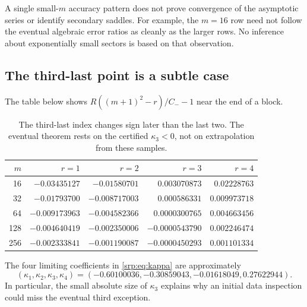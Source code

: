 \documentclass[11pt,a4paper]{article}
\numberwithin{equation}{section}
\theoremstyle{definition}
\theoremstyle{remark}
\begin{document}
A single small-$m$ accuracy pattern does not prove convergence of the
asymptotic series or identify secondary saddles. For example, the
$m=16$ row need not follow the eventual algebraic error ratios as cleanly
as the larger rows. No inference about exponentially small sectors is
based on that observation.

\subsection{The third-last point is a subtle case}
The table below shows
$R((m+1)^2-r)/C_- -1$ near the end of a block.
\begin{table}[htbp]
\centering\small
\begin{tabular}{r r r r r}
\toprule
$m$ & $r=1$ & $r=2$ & $r=3$ & $r=4$\\
\midrule
16 & $-0.03435127$ & $-0.01580701$ & $0.003070873$ & $0.02228763$\\
32 & $-0.01793700$ & $-0.008717003$ & $0.000586331$ & $0.009973718$\\
64 & $-0.009173963$ & $-0.004582366$ & $0.0000300765$ & $0.004663456$\\
128 & $-0.004640419$ & $-0.002350006$ & $-0.0000543790$ & $0.002246474$\\
256 & $-0.002333841$ & $-0.001190087$ & $-0.0000450293$ & $0.001101334$\\
\bottomrule
\end{tabular}
\caption{The third-last index changes sign later than the last two.
The eventual theorem rests on the certified $\kappa_3<0$, not on
extrapolation from these samples.}
\label{srp:tab:endpoints}
\end{table}

The four limiting coefficients in \eqref{srp:eq:kappa} are approximately
\[
 (\kappa_1,\kappa_2,\kappa_3,\kappa_4)
 =(-0.60100036,-0.30859043,-0.01618049,0.27622944).
\]
In particular, the small absolute size of $\kappa_3$ explains why an
initial data inspection could miss the eventual third exception.
\end{document}
